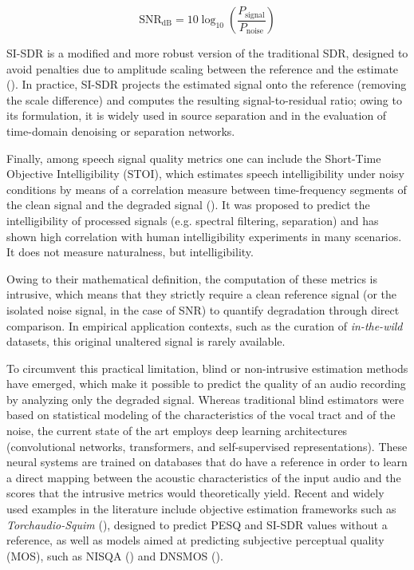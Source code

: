 \begin{equation}
    \label{eq:snr}
    \text{SNR}_{\text{dB}} = 10 \log_{10} \left( \frac{P_{\text{signal}}}{P_{\text{noise}}} \right)
\end{equation}

SI-SDR is a modified and more robust version of the traditional SDR, designed to avoid penalties due to amplitude scaling between the reference and the estimate (\cite{SISDR}). In practice, SI-SDR projects the estimated signal onto the reference (removing the scale difference) and computes the resulting signal-to-residual ratio; owing to its formulation, it is widely used in source separation and in the evaluation of time-domain denoising or separation networks.

Finally, among speech signal quality metrics one can include the Short-Time Objective Intelligibility (STOI), which estimates speech intelligibility under noisy conditions by means of a correlation measure between time-frequency segments of the clean signal and the degraded signal (\cite{STOI_ref}). It was proposed to predict the intelligibility of processed signals (e.g. spectral filtering, separation) and has shown high correlation with human intelligibility experiments in many scenarios. It does not measure naturalness, but intelligibility.

Owing to their mathematical definition, the computation of these metrics is intrusive, which means that they strictly require a clean reference signal (or the isolated noise signal, in the case of SNR) to quantify degradation through direct comparison. In empirical application contexts, such as the curation of \textit{in-the-wild} datasets, this original unaltered signal is rarely available.

To circumvent this practical limitation, blind or non-intrusive estimation methods have emerged, which make it possible to predict the quality of an audio recording by analyzing only the degraded signal. Whereas traditional blind estimators were based on statistical modeling of the characteristics of the vocal tract and of the noise, the current state of the art employs deep learning architectures (convolutional networks, transformers, and self-supervised representations). These neural systems are trained on databases that do have a reference in order to learn a direct mapping between the acoustic characteristics of the input audio and the scores that the intrusive metrics would theoretically yield. Recent and widely used examples in the literature include objective estimation frameworks such as \textit{Torchaudio-Squim} (\cite{squim}), designed to predict PESQ and SI-SDR values without a reference, as well as models aimed at predicting subjective perceptual quality (MOS), such as NISQA (\cite{nisqa}) and DNSMOS (\cite{dns_mos}).

